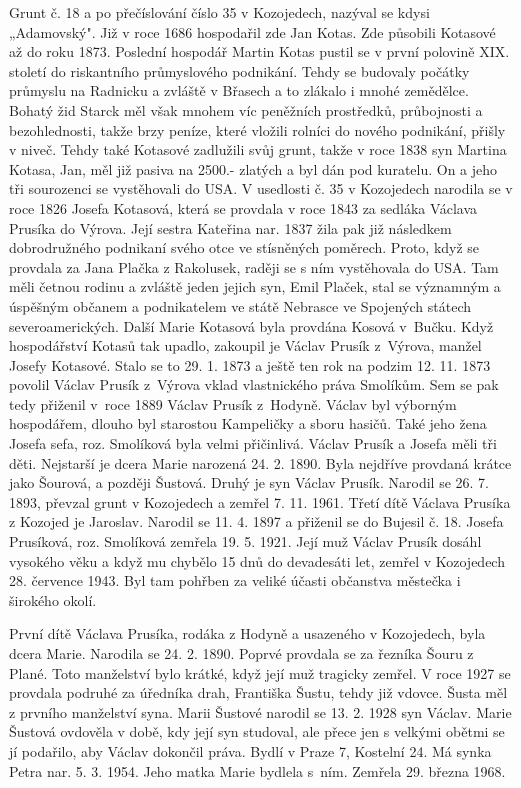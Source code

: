 \documentclass[../dejiny-rodu-prusiku.tex]{subfiles}
\begin{document}
Grunt č. 18 a po přečíslování číslo 35 v Kozojedech, nazýval se kdysi „Adamovský". Již v roce 1686 hospodařil zde Jan Kotas. Zde působili Kotasové až do roku 1873. Poslední hospodář Martin Kotas pustil se v první polovině XIX. století do riskantního průmyslového podnikání. Tehdy se budovaly počátky průmyslu na Radnicku a zvláště v Břasech a to zlákalo i mnohé zemědělce. Bohatý žid Starck měl však mnohem víc peněžních prostředků, průbojnosti a bezohlednosti, takže brzy peníze, které vložili rolníci do nového podnikání, přišly v niveč. Tehdy také Kotasové zadlužili svůj grunt, takže v roce 1838 syn Martina Kotasa, Jan, měl již pasiva na 2500.- zlatých a byl dán pod kuratelu. On a jeho tři sourozenci se vystěhovali do USA. V usedlosti č. 35 v Kozojedech narodila se v roce 1826 Josefa Kotasová, která se provdala v roce 1843 za sedláka Václava Prusíka do Výrova. Její sestra Kateřina nar. 1837 žila pak již následkem dobrodružného podnikaní své­ho otce ve stísněných poměrech. Proto, když se provdala za Jana Plačka z Rakolusek, raději se s ním vystěhovala do USA. Tam měli četnou rodinu a zvláště jeden jejich syn, Emil Plaček, stal se významným a úspěšným občanem a podnikatelem ve státě Nebrasce ve Spojených státech severoamerických. Další Marie Kotasová byla provdána Kosová v Bučku. Když hospodářství Kotasů tak upadlo, zakoupil je Václav Prusík z Výrova, manžel Josefy Kotasové.  Stalo se to 29. 1. 1873 a ještě ten rok na podzim 12. 11. 1873 povolil Václav Prusík z Výrova vklad vlastnického práva Smolíkům. Sem se pak tedy přiženil v roce 1889  Václav Prusík z Hodyně. Václav byl výborným hospodářem, dlouho byl starostou Kampeličky a sboru hasičů. Také jeho žena Josefa
sefa, roz. Smolíková byla velmi přičinlivá. Václav Prusík a Josefa měli tři děti. Nejstarší je dcera Marie narozená 24. 2. 1890. Byla nejdříve provdaná krátce jako Šourová, a později Šustová. Druhý je syn Václav Prusík. Narodil se 26. 7. 1893, převzal grunt v Kozojedech a zemřel 7. 11. 1961. Třetí dítě Václava Prusíka z Kozojed je Jaroslav. Narodil se 11. 4. 1897 a přiženil se do Bujesil č. 18. Josefa Prusíková, roz. Smolíková zemřela 19. 5. 1921. Její muž Václav Prusík dosáhl vysokého věku a když mu chybělo 15 dnů do devadesáti let, zemřel v Kozojedech 28. července 1943. Byl tam pohřben za veliké účasti občanstva městečka i širokého okolí.

První dítě Václava Prusíka, rodáka z Hodyně a usazeného v Kozojedech, byla dcera Marie. Narodila se 24. 2. 1890. Poprvé provdala se za řezníka Šouru z Plané. Toto manželství bylo krátké, když její muž tragicky zemřel. V roce 1927 se provdala podruhé za úředníka drah, Františka Šustu, tehdy již vdovce. Šusta měl z prvního man­želství syna. Marii Šustové narodil se 13. 2. 1928 syn Václav. Marie Šustová ovdověla v době, kdy její syn studoval, ale přece jen s velkými obětmi se jí podařilo, aby Václav dokončil práva. Bydlí v Praze 7, Kostelní 24. Má synka Petra nar. 5. 3. 1954. Jeho matka Marie bydlela s ním. Zemřela 29. března 1968.
\end{document}
